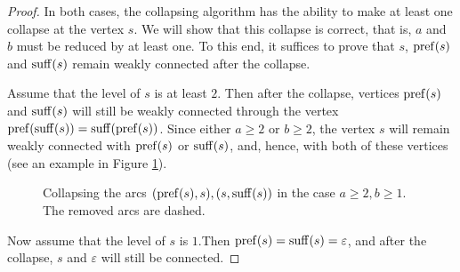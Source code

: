 \begin{proof}
In both cases, the collapsing algorithm has the ability to make at least one collapse at the vertex $ s $. We will show that this collapse is correct, that is, $ a $ and $ b $ must be reduced by at least one. To this end, it suffices to prove that $ s $, $ \operatorname{pref} (s) $ and $ \operatorname{suff} (s) $ remain weakly connected after the collapse.

Assume that the level of $ s $ is at least $ 2 $. Then after the collapse, vertices $ \operatorname{pref}(s) $ and $ \operatorname{suff} (s) $ will still be weakly connected through the vertex $ \operatorname{pref} (\operatorname{suff} (s)) = \operatorname{suff} (\operatorname{pref} (s)) $. Since either $ a \ge 2 $ or $ b \ge 2 $, the vertex $ s $ will remain weakly connected with $ \operatorname{pref} (s) $ or $ \operatorname{suff} (s) $, and, hence, with both of these vertices (see an example in Figure \ref{fig:collapsea2b1}).

\begin{figure}[ht]
\begin{center}

\end{center}
    
\caption{Collapsing the arcs $(\operatorname{pref}(s), s), (s, \operatorname{suff}(s))$ in the case $a \ge 2, b \ge 1$. The removed arcs are dashed. }\label{fig:collapsea2b1}
\end{figure}

Now assume that the level of $s$ is $1$.Then $ \operatorname{pref} (s) = \operatorname{suff} (s) = \varepsilon $, and after the collapse, $s$ and $ \varepsilon $ will still be connected.
\end{proof}

